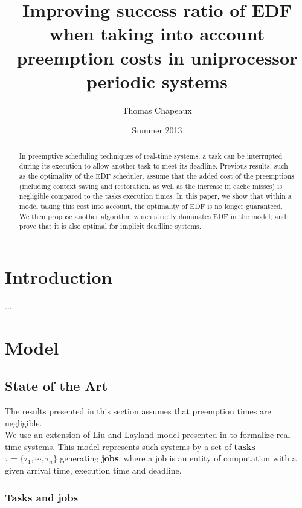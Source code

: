 \documentclass[a4paper,10pt]{article}
\title{Improving success ratio of EDF when taking into account preemption costs in uniprocessor periodic systems}
\author{Thomas Chapeaux}
\date{Summer 2013}
\begin{document}
\maketitle

\tableofcontents

\newpage

\begin{abstract}

In preemptive scheduling techniques of real-time systems, a task can be interrupted during its execution to allow another task to meet its deadline. Previous results, such as the optimality of the EDF scheduler, assume that the added cost of the preemptions (including context saving and restoration, as well as the increase in cache misses) is negligible compared to the tasks execution times. In this paper, we show that within a model taking this cost into account, the optimality of EDF is no longer guaranteed. We then propose another algorithm which strictly dominates EDF in the model, and prove that it is also optimal for implicit deadline systems.

\end{abstract}

\newpage

\section{Introduction}

...

\section{Model}

    \subsection{State of the Art}

        The results presented in this section assumes that preemption times are negligible.\\

        We use an extension of Liu and Layland model presented in \cite{Liu:2000:RS:518501} to formalize real-time systems. This model represents such systems by a set of \textbf{tasks} $\tau = \{\tau_1, \cdots, \tau_n\}$ generating \textbf{jobs}, where a job is an entity of computation with a given arrival time, execution time and deadline.

        \subsubsection{Tasks and jobs}
\end{document}
